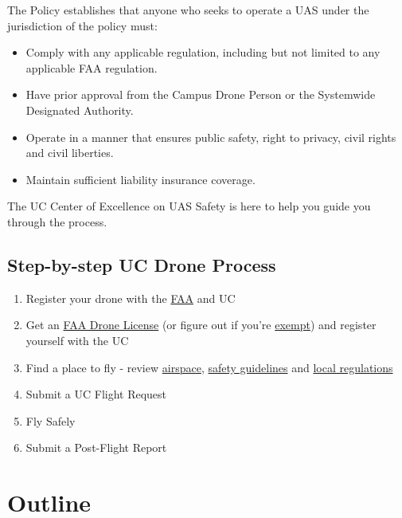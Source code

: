 \documentclass[
]{book}
\providecommand{\tightlist}{%
  \setlength{\itemsep}{0pt}\setlength{\parskip}{0pt}}
\begin{document}
The Policy establishes that anyone who seeks to operate a UAS under the jurisdiction of the policy must:

\begin{itemize}
\tightlist
\item
  Comply with any applicable regulation, including but not limited to any applicable FAA regulation.
\item
  Have prior approval from the Campus Drone Person or the Systemwide Designated Authority.
\item
  Operate in a manner that ensures public safety, right to privacy, civil rights and civil liberties.
\item
  Maintain sufficient liability insurance coverage.
\end{itemize}

The UC Center of Excellence on UAS Safety is here to help you guide you through the process.

\hypertarget{step-by-step-uc-drone-process}{%
\subsection*{Step-by-step UC Drone Process}\label{step-by-step-uc-drone-process}}

\begin{enumerate}
\def\labelenumi{\arabic{enumi}.}
\tightlist
\item
  Register your drone with the \protect\hyperlink{ch-register}{FAA} and UC
\item
  Get an \protect\hyperlink{ch-get-license}{FAA Drone License} (or figure out if you're \protect\hyperlink{ch-license}{exempt}) and register yourself with the UC
\item
  Find a place to fly - review \protect\hyperlink{ch-airspace-info}{airspace}, \protect\hyperlink{ch-safety-guidelines}{safety guidelines} and \protect\hyperlink{ch-local-UAS-regulations}{local regulations}
\item
  Submit a UC Flight Request
\item
  Fly Safely
\item
  Submit a Post-Flight Report
\end{enumerate}

\hypertarget{outline}{%
\section*{Outline}\label{outline}}
\end{document}
